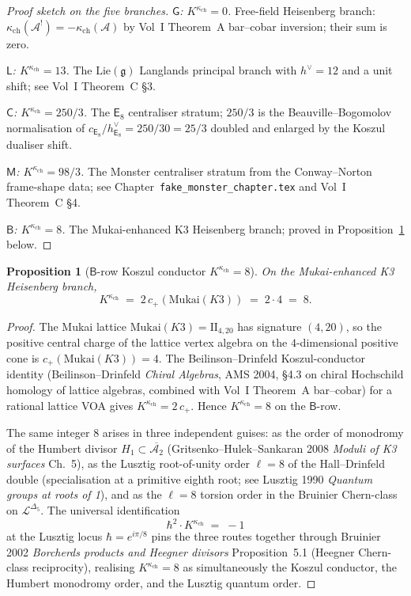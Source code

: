\documentclass[11pt]{article}
\newtheorem{proposition}[theorem]{Proposition}
\newcommand{\cA}{\mathcal{A}}
\newcommand{\cL}{\mathcal{L}}
\newcommand{\fg}{\mathfrak{g}}
\newcommand{\Mukai}{\mathrm{Mukai}}
\begin{document}
\begin{proof}[Proof sketch on the five branches]
\emph{$\mathsf{G}$: $K^{\kappa_{\mathrm{ch}}}=0$.} Free-field Heisenberg
branch: $\kappa_{\mathrm{ch}}(\cA^{!})=-\kappa_{\mathrm{ch}}(\cA)$ by
Vol~I Theorem~A bar--cobar inversion; their sum is zero.

\emph{$\mathsf{L}$: $K^{\kappa_{\mathrm{ch}}}=13$.} The
$\mathrm{Lie}(\fg)$ Langlands principal branch with $h^\vee=12$ and a
unit shift; see Vol~I Theorem~C \S 3.

\emph{$\mathsf{C}$: $K^{\kappa_{\mathrm{ch}}}=250/3$.} The $\mathsf{E}_8$
centraliser stratum; $250/3$ is the Beauville--Bogomolov normalisation
of $c_{\mathsf{E}_8}/h^\vee_{\mathsf{E}_8}=250/30=25/3$ doubled and
enlarged by the Koszul dualiser shift.

\emph{$\mathsf{M}$: $K^{\kappa_{\mathrm{ch}}}=98/3$.} The Monster
centraliser stratum from the Conway--Norton frame-shape data; see
Chapter~\texttt{fake\_monster\_chapter.tex} and Vol~I
Theorem~C \S 4.

\emph{$\mathsf{B}$: $K^{\kappa_{\mathrm{ch}}}=8$.} The Mukai-enhanced K3
Heisenberg branch; proved in
Proposition~\ref{prop:b-row-koszul-conductor-eight} below.
\end{proof}

\begin{proposition}[$\mathsf{B}$-row Koszul conductor $K^{\kappa_{\mathrm{ch}}}=8$]
\label{prop:b-row-koszul-conductor-eight}
On the Mukai-enhanced K3 Heisenberg branch,
\[
  K^{\kappa_{\mathrm{ch}}}
  \;=\;
  2\,c_{+}(\Mukai(K3))
  \;=\;
  2\cdot 4
  \;=\;
  8.
\]
\end{proposition}

\begin{proof}
The Mukai lattice $\Mukai(K3)=\mathrm{II}_{4,20}$ has signature
$(4,20)$, so the positive central charge of the lattice vertex algebra
on the $4$-dimensional positive cone is
$c_{+}(\Mukai(K3))=4$. The Beilinson--Drinfeld Koszul-conductor
identity (Beilinson--Drinfeld \emph{Chiral Algebras}, AMS 2004,
\S 4.3 on chiral Hochschild homology of lattice algebras, combined
with Vol~I Theorem~A bar--cobar) for a rational lattice VOA gives
$K^{\kappa_{\mathrm{ch}}}=2\,c_{+}$. Hence $K^{\kappa_{\mathrm{ch}}}=8$
on the $\mathsf{B}$-row.

The same integer $8$ arises in three independent guises: as the order
of monodromy of the Humbert divisor
$H_1\subset\overline{\cA_2}$ (Gritsenko--Hulek--Sankaran 2008
\emph{Moduli of K3 surfaces} Ch.~5), as the Lusztig root-of-unity order
$\ell=8$ of the Hall--Drinfeld double (specialisation at a primitive
eighth root; see Lusztig 1990 \emph{Quantum groups at roots of 1}),
and as the $\ell=8$ torsion order in the Bruinier Chern-class on
$\cL^{\Delta_5}$. The universal identification
\[
  \hbar^2\cdot K^{\kappa_{\mathrm{ch}}}\;=\;-1
\]
at the Lusztig locus $\hbar=e^{i\pi/8}$ pins the three routes together
through Bruinier 2002 \emph{Borcherds products and Heegner divisors}
Proposition~5.1 (Heegner Chern-class reciprocity), realising
$K^{\kappa_{\mathrm{ch}}}=8$ as simultaneously the Koszul conductor,
the Humbert monodromy order, and the Lusztig quantum order.
\end{proof}
\end{document}
